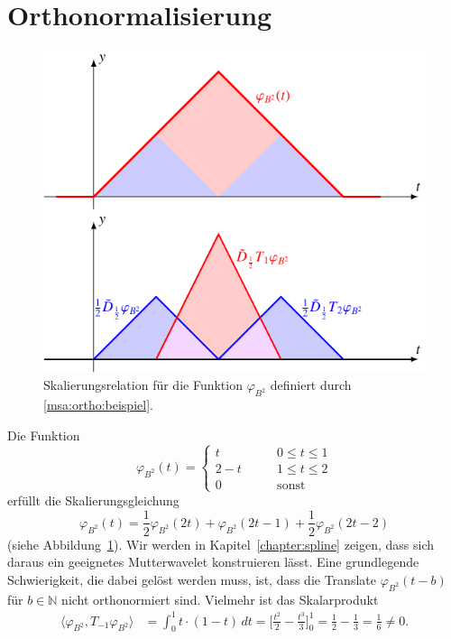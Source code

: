 %
%
%
\section{Orthonormalisierung
\label{section:orthonormalisierung}}
\begin{figure}
\centering
\includegraphics{chapters/6-msa/images/b2skal.pdf}
\caption{Skalierungsrelation für die Funktion $\varphi_{B^2}$
definiert durch \eqref{msa:ortho:beispiel}.
\label{msa:ortho:beispielfig}}
\end{figure}
Die Funktion
\begin{equation}
\varphi_{B^2}(t)
=
\begin{cases}
  t&\qquad 0\le t \le 1\\
2-t&\qquad 1\le t \le 2\\
  0&\qquad \text{sonst}
\end{cases}
\label{msa:ortho:beispiel}
\end{equation}
erfüllt die Skalierungsgleichung
\begin{equation}
\varphi_{B^2}(t)
= 
\frac12\varphi_{B^2}(2t)
+
\varphi_{B^2}(2t-1)
+
\frac12\varphi_{B^2}(2t-2)
\label{eq:skalierung-phi1-proto}
\end{equation}
(siehe Abbildung~\ref{msa:ortho:beispielfig}).
Wir werden in Kapitel~\ref{chapter:spline} zeigen, dass sich daraus ein
geeignetes Mutterwavelet konstruieren lässt.
Eine grundlegende Schwierigkeit, die dabei gelöst werden muss, ist, dass
die Translate $\varphi_{B^2}(t-b)$ für $b\in\mathbb N$ nicht orthonormiert
sind.
Vielmehr ist das Skalarprodukt
\begin{align*}
\langle \varphi_{B^2}, T_{-1}\varphi_{B^2}\rangle
&=
\int_0^1 t\cdot (1-t)\,dt
=
\biggl[
\frac{t^2}{2}-\frac{t^3}{3}
\biggl]_0^1
=
\frac12-\frac13 = \frac16\ne 0.
\end{align*}

